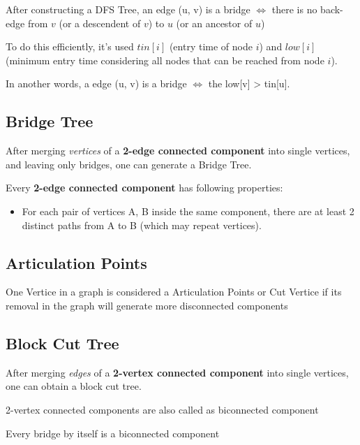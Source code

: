 		After constructing a DFS Tree, an edge (u, v) is a bridge $\iff$ there is no back-edge from $v$ (or a descendent of $v$) to $u$ (or an ancestor of $u$)
		
		To do this efficiently, it's used $tin[i]$ (entry time of node $i$) and $low[i]$ (minimum entry time considering all nodes that can be reached from node $i$).
		
		In another words, a edge (u, v) is a bridge $\iff$ the low[v] > tin[u].


	\subsection{Bridge Tree}

	After merging \textit{vertices} of a \textbf{2-edge connected component} into single vertices, and leaving only bridges, one can generate a Bridge Tree.

	Every \textbf{2-edge connected component} has following properties:

    \begin{itemize}
		\item For each pair of vertices {A, B} inside the same component, there are at least 2 distinct paths from A to B (which may repeat vertices).
	\end{itemize}

	
	\subsection{Articulation Points} 

	One Vertice in a graph is considered a Articulation Points or Cut Vertice if its removal in the graph will generate more disconnected components


	\subsection{Block Cut Tree}

	After merging \textit{edges} of a \textbf{2-vertex connected component} into single vertices, one can obtain a block cut tree.

	2-vertex connected components are also called as biconnected component
	
	Every bridge by itself is a biconnected component

